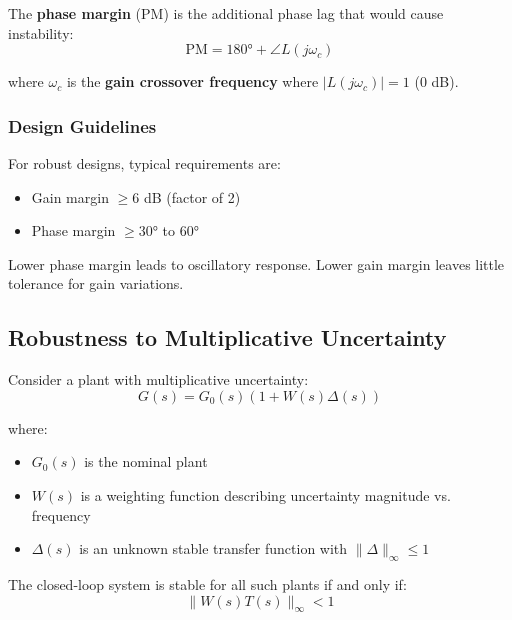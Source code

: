 The \textbf{phase margin} (PM) is the additional phase lag that would cause instability:
\begin{equation}
\text{PM} = 180° + \angle L(j\omega_c)
\label{eq:phase_margin}
\end{equation}

where $\omega_c$ is the \textbf{gain crossover frequency} where $|L(j\omega_c)| = 1$ (0 dB).

\subsubsection{Design Guidelines}

For robust designs, typical requirements are:
\begin{itemize}
    \item Gain margin $\geq 6$ dB (factor of 2)
    \item Phase margin $\geq 30°$ to $60°$
\end{itemize}

Lower phase margin leads to oscillatory response. Lower gain margin leaves little tolerance for gain variations.


\subsection{Robustness to Multiplicative Uncertainty}

Consider a plant with multiplicative uncertainty:
\begin{equation}
G(s) = G_0(s)(1 + W(s)\Delta(s))
\label{eq:mult_uncertainty}
\end{equation}

where:
\begin{itemize}
    \item $G_0(s)$ is the nominal plant
    \item $W(s)$ is a weighting function describing uncertainty magnitude vs. frequency
    \item $\Delta(s)$ is an unknown stable transfer function with $\|\Delta\|_{\infty} \leq 1$
\end{itemize}

The closed-loop system is stable for all such plants if and only if:
\begin{equation}
\boxed{\|W(s)T(s)\|_{\infty} < 1}
\label{eq:robust_stability_mult}
\end{equation}

